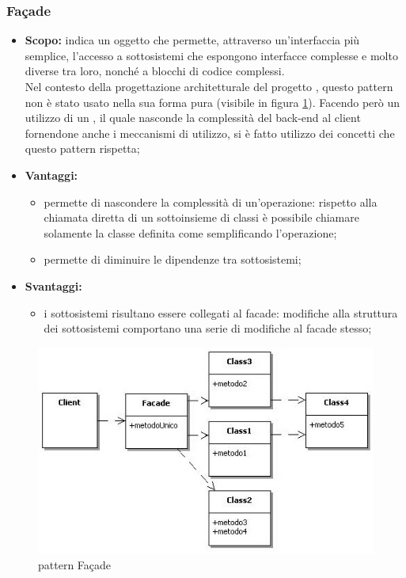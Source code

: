     \subsubsection{Façade}
      \begin{itemize}
       \item \textbf{Scopo:}  indica un oggetto che permette, attraverso un'interfaccia più semplice, l'accesso a sottosistemi che espongono interfacce complesse e molto diverse tra loro, nonché a blocchi di codice complessi. \\
       Nel contesto della progettazione architetturale del progetto \PROGETTO, questo pattern non è stato usato nella sua forma pura (visibile in figura \ref{fig:facade}). Facendo però un utilizzo di un , il quale nasconde la complessità del back-end al client fornendone anche i meccanismi di utilizzo, si è fatto utilizzo dei concetti che questo pattern rispetta;
	\item \textbf{Vantaggi:}
	  \begin{itemize}
	   \item permette di nascondere la complessità di un'operazione: rispetto alla chiamata diretta di un sottoinsieme di classi è possibile chiamare solamente la classe definita come  semplificando l'operazione;
	   \item permette di diminuire le dipendenze tra sottosistemi;
	  \end{itemize}\newpage
	\item \textbf{Svantaggi:}
	  \begin{itemize}
	   \item i sottosistemi risultano essere collegati al facade: modifiche alla struttura dei sottosistemi comportano una serie di modifiche al facade stesso;
	  \end{itemize}
	\end{itemize}
	\begin{figure}[h]
		\centering
		\includegraphics[width=\textwidth,height=\textheight,keepaspectratio,scale=0.1]{images/patternfacade.jpg}
		\caption{pattern Façade}\label{fig:facade}
	\end{figure}
